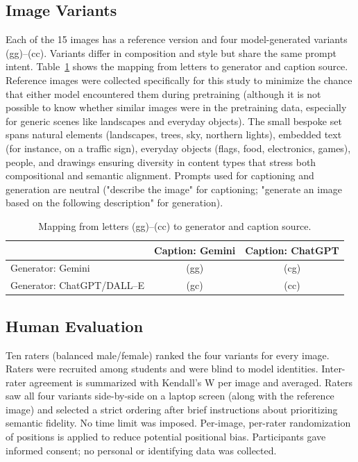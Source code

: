 \documentclass[conference]{IEEEtran}
\begin{document}
\subsection{Image Variants}
Each of the 15 images has a reference version and four model-generated variants (gg)--(cc). Variants differ in composition and style but share the same prompt intent. Table~\ref{tab:variant_mapping} shows the mapping from letters to generator and caption source.
Reference images were collected specifically for this study to minimize the chance that either model encountered them during pretraining (although it is not possible to know whether similar images were in the pretraining data, especially for generic scenes like landscapes and everyday objects). The small bespoke set spans natural elements (landscapes, trees, sky, northern lights), embedded text (for instance, on a traffic sign), everyday objects (flags, food, electronics, games), people, and drawings ensuring diversity in content types that stress both compositional and semantic alignment. Prompts used for captioning and generation are neutral ("describe the image" for captioning; "generate an image based on the following description" for generation).
\begin{table}[!h]
  \centering
  \caption{Mapping from letters (gg)--(cc) to generator and caption source.}
  \label{tab:variant_mapping}
  \begin{tabular}{@{}lcc@{}}
    \toprule
     & Caption: Gemini & Caption: ChatGPT \\
    \midrule
    Generator: Gemini & (gg) & (cg) \\
    Generator: ChatGPT/DALL--E & (gc) & (cc) \\
    \bottomrule
  \end{tabular}
\end{table} 

\subsection{Human Evaluation}
Ten raters (balanced male/female) ranked the four variants for every image. Raters were recruited among students and were blind to model identities. Inter-rater agreement is summarized with Kendall's W per image and averaged. Raters saw all four variants side-by-side on a laptop screen (along with the reference image) and selected a strict ordering after brief instructions about prioritizing semantic fidelity. No time limit was imposed. %
Per-image, per-rater randomization of positions is applied to reduce potential positional bias.
Participants gave informed consent; no personal or identifying data was collected.
\end{document}
